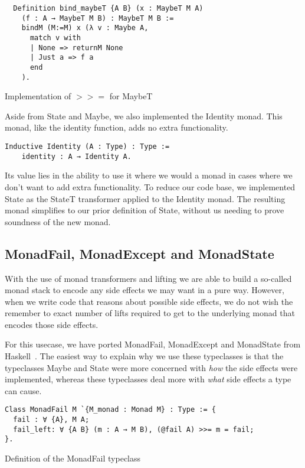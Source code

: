 \begin{listing}
\begin{verbatim}
  Definition bind_maybeT {A B} (x : MaybeT M A) 
    (f : A → MaybeT M B) : MaybeT M B :=
    bindM (M:=M) x (λ v : Maybe A,
      match v with
      | None => returnM None
      | Just a => f a
      end
    ).
\end{verbatim}
\caption{Implementation of $>>=$ for MaybeT}
\label{lst:bind_maybeT}
\end{listing}

Aside from State and Maybe, we also implemented the Identity monad. This monad,
like the identity function, adds no extra functionality. 
\begin{verbatim}
Inductive Identity (A : Type) : Type := 
    identity : A → Identity A.
\end{verbatim}

Its value lies in the
ability to use it where we would a monad in cases where we don't want to add
extra functionality. To reduce our code base, we implemented State as the
StateT transformer applied to the Identity monad. The resulting monad
simplifies to our prior definition of State, without us needing to prove
soundness of the new monad.


\subsection{MonadFail, MonadExcept and MonadState}
With the use of monad transformers and lifting we are able to build a so-called 
monad stack to encode any side effects we may want in a pure way. However, when
we write code that reasons about possible side effects, we do not wish the
remember to exact number of lifts required to get to the underlying monad that
encodes those side effects. 

For this usecase, we have ported MonadFail, MonadExcept and MonadState from
Haskell~\cite{gibbons2011just}. The easiest way to explain why we use these typeclasses is that 
the typeclasses Maybe and State were more concerned with
\textit{how} the side effects were implemented, whereas these typeclasses deal 
more with \textit{what} side effects a type can cause.

\begin{listing}
\begin{verbatim}
Class MonadFail M `{M_monad : Monad M} : Type := {
  fail : ∀ {A}, M A;
  fail_left: ∀ {A B} (m : A → M B), (@fail A) >>= m = fail;
}.
\end{verbatim}
\caption{Definition of the MonadFail typeclass}
\label{lst:monadfail}
\end{listing}

